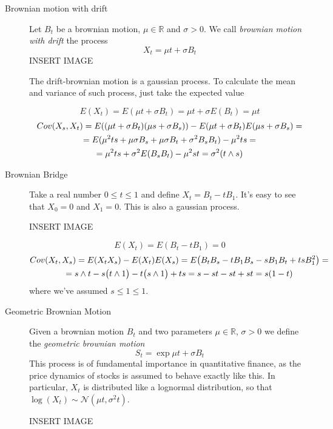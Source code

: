 \begin{description}
    \item[Brownian motion with drift] Let $B_t$ be a brownian motion, $\mu \in \mathbb{R}$ and $\sigma > 0$. We call \textit{brownian motion with drift} the process 
    \begin{equation}
        X_t = \mu t + \sigma B_t
    \end{equation}
    INSERT IMAGE

    The drift-brownian motion is a gaussian process. To calculate the mean and variance of such process, just take the expected value

    \begin{equation}
        E(X_t) = E(\mu t + \sigma B_t) = \mu t + \sigma E(B_t) = \mu t
    \end{equation}
    \begin{gather}
        Cov(X_s, X_t) = E((\mu t + \sigma B_t)(\mu s + \sigma B_s)) - E(\mu t + \sigma B_t) E(\mu s + \sigma B_s) = \notag \\
        = E(\mu^2 t s + \mu \sigma B_s + \mu \sigma B_t + \sigma^2 B_s B_t) - \mu^2 ts = \notag \\
        = \mu^2 ts + \sigma^2 E(B_s B_t) - \mu^2 st = \sigma^2 (t \wedge s)
    \end{gather}
    \item[Brownian Bridge] Take a real number $0 \leq t \leq 1$ and define $X_t = B_t - tB_1$. It's easy to see that $X_0 = 0$ and $X_1 = 0$. This is also a gaussian process.

    INSERT IMAGE

    \begin{equation}
        E(X_t) = E(B_t - t B_1) = 0
    \end{equation}
    \begin{gather}
        Cov(X_t, X_s) = E(X_t X_s) - E(X_t) E(X_s) = E\big(B_t B_s - t B_1 B_s - s B_1 B_t + ts B_1^2\big) = \notag \\
        = s \wedge t - s \big(t \wedge 1\big) - t \big( s \wedge 1 \big) + ts = s -st -st + st = s(1-t)
    \end{gather}
    where we've assumed $s \leq 1 \leq 1$. 
    \item[Geometric Brownian Motion] Given a brownian motion $B_t$ and two parameters $\mu \in \mathbb{R}$, $\sigma > 0$ we define the \textit{geometric brownian motion}
    \begin{equation}
        S_t = \exp{\mu t + \sigma B_t}
    \end{equation}
    This process is of fundamental importance in quantitative finance, as the price dynamics of stocks is assumed to behave exactly like this. In particular, $X_t$ is distributed like a lognormal distribution, so that $\log(X_t) \sim \mathcal{N}(\mu t, \sigma^2 t)$. 

    INSERT IMAGE
\end{description}

